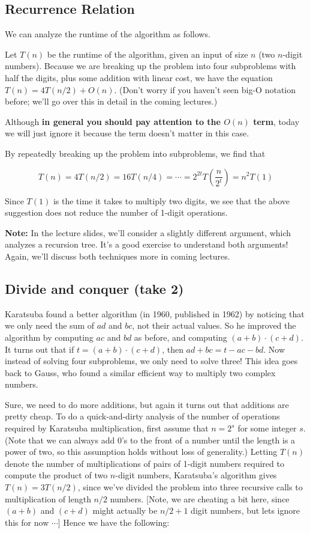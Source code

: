 \documentclass [12pt]{article}
\begin{document}
\subsection{Recurrence Relation}
We can analyze the runtime of the algorithm as follows.

Let $T(n)$ be the runtime of the algorithm, given an input of size $n$ (two $n$-digit numbers).
Because we are breaking up the problem into four subproblems with half the digits, plus some
addition with linear cost, we have the equation $T(n) = 4T(n/2) + O(n)$. (Don’t worry if you
haven’t seen big-O notation before; we’ll go over this in detail in the coming lectures.)

Although \textbf{in general you should pay attention to the $O(n)$ term}, today we will just ignore
it because the term doesn’t matter in this case.

By repeatedly breaking up the problem into subproblems, we find that

$$
T(n) = 4T(n/2) = 16T(n/4) = \cdots = 2^{2t}T\left(\frac{n}{2^t}\right) = n^2 T(1)
$$

Since $T(1)$ is the time it takes to multiply two digits, we see that the above suggestion does not reduce the number of 1-digit operations.

\textbf{Note:} In the lecture slides, we’ll consider a slightly different argument, which analyzes a
recursion tree. It’s a good exercise to understand both arguments! Again, we’ll discuss both
techniques more in coming lectures.


\subsection{Divide and conquer (take 2)}

Karatsuba found a better algorithm (in 1960, published in 1962) by noticing that we only need the sum of $ad$ and $bc$, not their actual values. So he improved the algorithm by computing $ac$ and $bd$ as before, and computing $(a+b)\cdot (c +d)$. It turns out that if $t = (a+b) \cdot (c +d)$, then $ad + bc = t - ac - bd$. Now instead of solving four subproblems, we only need to solve three! This idea goes back to Gauss, who found a similar efficient way to multiply two complex numbers.

Sure, we need to do more additions, but again it turns out that additions are pretty cheap. To do a quick-and-dirty analysis of the number of operations required by Karatsuba multiplication, first assume that $n = 2^s$ for some integer $s$. (Note that we can always add $0$’s to the front of a number until the length is a power of two, so this assumption holds without loss of generality.) Letting $T(n)$ denote the number of multiplications of pairs of 1-digit numbers required to compute the product of two $n$-digit numbers, Karatsuba’s algorithm gives $T(n) = 3T(n/2)$, since we’ve divided the problem into three recursive calls to multiplication of length $n/2$ numbers. [Note, we are cheating a bit here, since $(a + b)$ and $(c + d)$ might actually be $n/2 + 1$ digit numbers, but lets ignore this for now $\cdots$] Hence we have the following:
\end{document}
